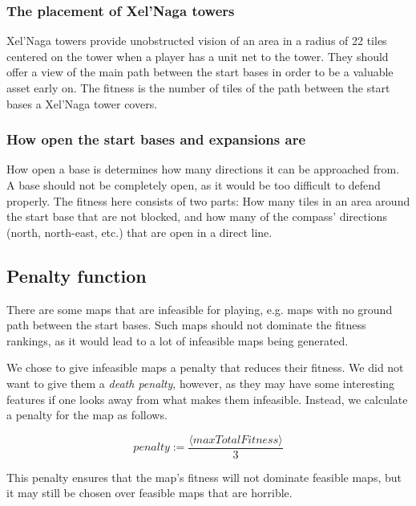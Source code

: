 	\subsubsection*{The placement of Xel'Naga towers}
	Xel'Naga towers provide unobstructed vision of an area in a radius of 22 tiles centered on the tower when a player has a unit net to the tower. They should offer a view of the main path between the start bases in order to be a valuable asset early on. The fitness is the number of tiles of the path between the start bases a Xel'Naga tower covers.

	\subsubsection*{How open the start bases and expansions are}
	How open a base is determines how many directions it can be approached from. A base should not be completely open, as it would be too difficult to defend properly. The fitness here consists of two parts: How many tiles in an area around the start base that are not blocked, and how many of the compass' directions (north, north-east, etc.) that are open in a direct line.

\subsection{Penalty function}
\label{methodology_mapfitness_penalty}
There are some maps that are infeasible for playing, e.g. maps with no ground path between the start bases. Such maps should not dominate the fitness rankings, as it would lead to a lot of infeasible maps being generated. 

We chose to give infeasible maps a penalty that reduces their fitness. We did not want to give them a \textit{death penalty}\cite{coello2012constraint}, however, as they may have some interesting features if one looks away from what makes them infeasible. Instead, we calculate a penalty for the map as follows.

\begin{equation}
	penalty := \frac{\langle maxTotalFitness\rangle}{3}
\end{equation}

This penalty ensures that the map's fitness will not dominate feasible maps, but it may still be chosen over feasible maps that are horrible.